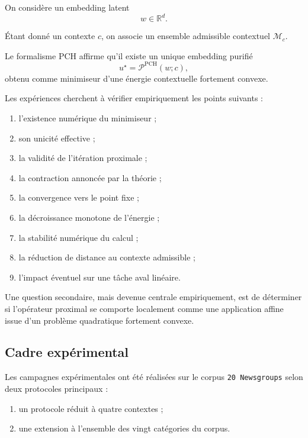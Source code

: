 \documentclass[11pt,a4paper]{article}
\newcommand{\1}{\mathbf 1}
\begin{document}
On considère un embedding latent
\[
w \in \mathbb R^d.
\]

Étant donné un contexte \(c\), on associe un ensemble admissible contextuel \(\mathcal M_c\).

Le formalisme PCH affirme qu’il existe un unique embedding purifié
\[
u^\star = \mathcal P^{\mathrm{PCH}}(w;c),
\]
obtenu comme minimiseur d’une énergie contextuelle fortement convexe.

Les expériences cherchent à vérifier empiriquement les points suivants :
\begin{enumerate}[leftmargin=2em]
    \item l’existence numérique du minimiseur ;
    \item son unicité effective ;
    \item la validité de l’itération proximale ;
    \item la contraction annoncée par la théorie ;
    \item la convergence vers le point fixe ;
    \item la décroissance monotone de l’énergie ;
    \item la stabilité numérique du calcul ;
    \item la réduction de distance au contexte admissible ;
    \item l’impact éventuel sur une tâche aval linéaire.
\end{enumerate}

Une question secondaire, mais devenue centrale empiriquement, est de déterminer si l’opérateur proximal se comporte localement comme une application affine issue d’un problème quadratique fortement convexe.

\subsection{Cadre expérimental}

Les campagnes expérimentales ont été réalisées sur le corpus \texttt{20 Newsgroups} selon deux protocoles principaux :

\begin{enumerate}[leftmargin=2em]
    \item un protocole réduit à quatre contextes ;
    \item une extension à l’ensemble des vingt catégories du corpus.
\end{enumerate}
\end{document}
